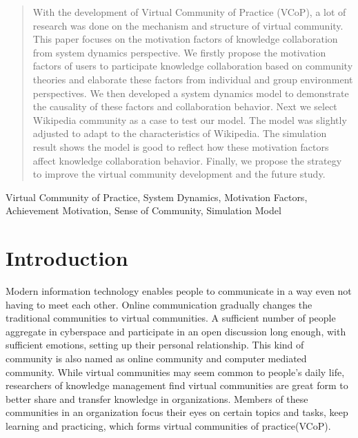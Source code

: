 \documentclass[doublespacing]{elsarticle}
\begin{document}
\begin{frontmatter}

\begin{abstract}
 With the development of Virtual Community of Practice (VCoP), a lot
 of research was done on the mechanism and structure of virtual
 community. This paper focuses on the motivation factors of knowledge
 collaboration from system dynamics perspective. We firstly propose
 the motivation factors of users to participate knowledge
 collaboration based on community theories and  elaborate these
 factors from individual and group environment perspectives. We then
 developed a system dynamics model to demonstrate the causality of
 these factors and collaboration behavior. Next we select Wikipedia
 community as a case to test our model. The model was slightly
 adjusted to adapt to the characteristics of Wikipedia. The simulation
 result shows the model is good to reflect how these motivation
 factors affect knowledge collaboration behavior. Finally, we propose the strategy to improve the virtual community development and the future study. 

\end{abstract}

\begin{keyword}
  Virtual Community of Practice, System Dynamics, Motivation Factors, Achievement Motivation, Sense of Community, Simulation Model

\end{keyword}
\end{frontmatter}

\section{Introduction}
\label{sec:introduction}
Modern information technology enables people to communicate in a way
even not having to meet each other. Online communication gradually changes the
traditional communities to virtual communities.  A sufficient number of
people  aggregate in cyberspace and participate in  an open discussion
long enough, with sufficient emotions, setting up  their personal
relationship\cite{rheingold2000vch}. This kind of community is also
named as online community and computer mediated community. While
virtual communities may seem common to people's daily life,
researchers of knowledge management find virtual communities are great
form to better share and transfer knowledge in organizations. Members
of these communities in an organization focus their eyes on certain
topics and tasks, keep learning and practicing,  which forms virtual
communities of practice(VCoP). 
\end{document}
